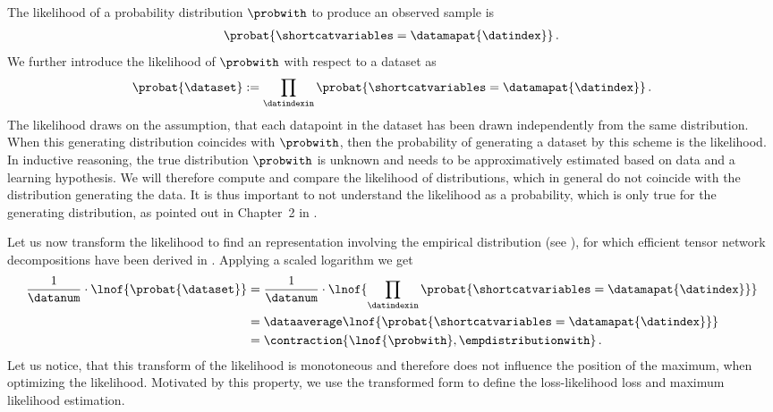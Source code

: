The likelihood of a probability distribution $\probwith$ to produce an observed sample is
\begin{align*}
    \probat{\shortcatvariables = \datamapat{\datindex}} \, .
\end{align*}
We further introduce the likelihood of $\probwith$ with respect to a dataset as
\begin{align*}
    \probat{\dataset} := \prod_{\datindexin} \probat{\shortcatvariables = \datamapat{\datindex}} \, .
\end{align*}
The likelihood draws on the assumption, that each datapoint in the dataset has been drawn independently from the same distribution.
When this generating distribution coincides with $\probwith$, then the probability of generating a dataset by this scheme is the likelihood.
In inductive reasoning, the true distribution $\probwith$ is unknown and needs to be approximatively estimated based on data and a learning hypothesis.
We will therefore compute and compare the likelihood of distributions, which in general do not coincide with the distribution generating the data.
It is thus important to not understand the likelihood as a probability, which is only true for the generating distribution, as pointed out in Chapter~2 in \cite{mackay_information_2003}.

Let us now transform the likelihood to find an representation involving the empirical distribution (see ), for which efficient tensor network decompositions have been derived in .
Applying a scaled logarithm we get
\begin{align*}
    \frac{1}{\datanum} \cdot \lnof{\probat{\dataset}}
    &= \frac{1}{\datanum} \cdot \lnof{\prod_{\datindexin} \probat{\shortcatvariables = \datamapat{\datindex}}} \\
    &= \dataaverage \lnof{\probat{\shortcatvariables = \datamapat{\datindex}}} \\
    &= \contraction{\lnof{\probwith},\empdistributionwith} \, .
\end{align*}
Let us notice, that this transform of the likelihood is monotoneous and therefore does not influence the position of the maximum, when optimizing the likelihood.
Motivated by this property, we use the transformed form to define the loss-likelihood loss and maximum likelihood estimation.

